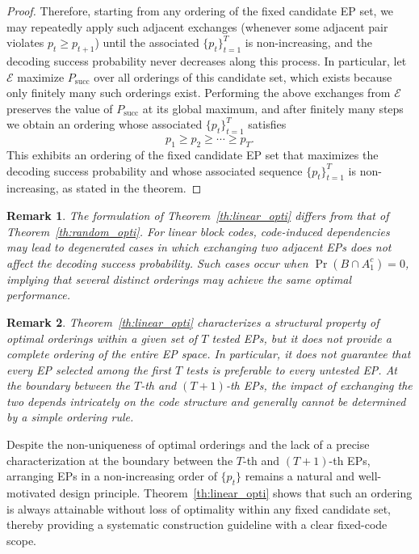 \documentclass[letterpaper,draftclsnofoot,onecolumn]{IEEEtran}
\newtheorem{remark}{Remark}
\begin{document}
\begin{proof}
Therefore, starting from any ordering of the fixed candidate EP set, we may repeatedly apply such adjacent exchanges (whenever some adjacent pair violates $p_t\ge p_{t+1}$) until the associated $\{p_t\}_{t=1}^{T}$ is non-increasing, and the decoding success probability never decreases along this process. In particular, let $\mathcal{E}$ maximize $P_{\mathrm{succ}}$ over all orderings of this candidate set, which exists because only finitely many such orderings exist. Performing the above exchanges from $\mathcal{E}$ preserves the value of $P_{\mathrm{succ}}$ at its global maximum, and after finitely many steps we obtain an ordering whose associated $\{p_t\}_{t=1}^{T}$ satisfies
\begin{equation}
p_1 \ge p_2 \ge \cdots \ge p_T.
\end{equation}
This exhibits an ordering of the fixed candidate EP set that maximizes the decoding success probability and whose associated sequence $\{p_t\}_{t=1}^{T}$ is non-increasing, as stated in the theorem.
\end{proof}


\begin{remark}
The formulation of Theorem~\ref{th:linear_opti} differs from that of Theorem~\ref{th:random_opti}. 
For linear block codes, code-induced dependencies may lead to degenerated cases in which exchanging two adjacent EPs does not affect the decoding success probability. 
Such cases occur when $\Pr(B\cap A_1^c)=0$, implying that several distinct orderings may achieve the same optimal performance.
\end{remark}

\begin{remark}
Theorem~\ref{th:linear_opti} characterizes a structural property of optimal orderings within a given set of $T$ tested EPs, but it does not provide a complete ordering of the entire EP space. 
In particular, it does not guarantee that every EP selected among the first $T$ tests is preferable to every untested EP. 
At the boundary between the $T$-th and $(T+1)$-th EPs, the impact of exchanging the two depends intricately on the code structure and generally cannot be determined by a simple ordering rule.
\end{remark}

Despite the non-uniqueness of optimal orderings and the lack of a precise characterization at the boundary between the $T$-th and $(T+1)$-th EPs, arranging EPs in a non-increasing order of $\{p_t\}$ remains a natural and well-motivated design principle. 
Theorem~\ref{th:linear_opti} shows that such an ordering is always attainable without loss of optimality within any fixed candidate set, thereby providing a systematic construction guideline with a clear fixed-code scope.
\end{document}
